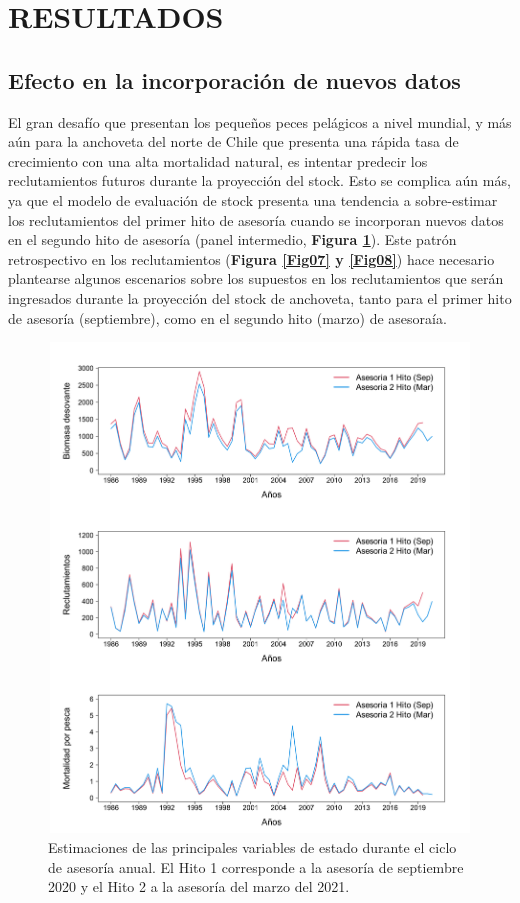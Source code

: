 \documentclass[letter,11pt]{article}
\begin{document}
\clearpage
\newpage

\section{RESULTADOS}


\subsection{Efecto en la incorporaci\'on de nuevos datos}


El gran desaf\'io que presentan los peque\~{n}os peces pel\'agicos a nivel
mundial, y m\'as a\'un para la anchoveta del norte de Chile que presenta una
r\'apida tasa de crecimiento con una alta mortalidad natural, es intentar predecir los
reclutamientos futuros durante la proyecci\'on del stock. Esto se complica a\'un m\'as,
ya que el modelo de evaluaci\'on de stock presenta una tendencia a sobre-estimar
los reclutamientos del primer hito de asesor\'ia cuando se incorporan nuevos datos
en el segundo hito de asesor\'ia (panel intermedio, \textbf{Figura \ref{Fig14}}). Este patr\'on
retrospectivo en los reclutamientos (\textbf{Figura \ref{Fig07} y \ref{Fig08}}) hace
necesario plantearse algunos escenarios sobre los supuestos en los reclutamientos
que ser\'an ingresados durante la proyecci\'on del stock de anchoveta, tanto para el
primer hito de asesor\'ia (septiembre), como en el segundo hito (marzo) de
asesora\'ia.


\vspace{0.5cm}
\begin{figure}[htb!]
 \centering
 \includegraphics[width=16cm,height=13cm]{fig/figura14.pdf}
 \caption{Estimaciones de las principales variables de estado durante el ciclo de asesor\'ia anual. El Hito 1 corresponde a la asesor\'ia de septiembre 2020 y el Hito 2 a la asesor\'ia del marzo del 2021.}
 \label{Fig14}
\end{figure}
\end{document}
